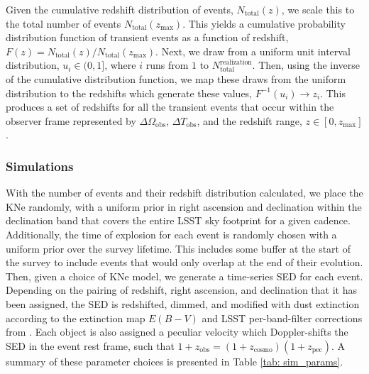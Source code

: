 Given the cumulative redshift distribution of events, $N_{\mathrm{total}}(z)$, we scale this to the total number of events $N_{\mathrm{total}}(z_{\mathrm{max}})$. This yields a cumulative probability distribution function of transient events as a function of redshift, $F(z) = N_{\mathrm{total}}(z)/ N_{\mathrm{total}}(z_{\mathrm{max}})$. Next, we draw from a uniform unit interval distribution, $u_i\in(0,1]$, where $i$ runs from $1$ to $N_{\mathrm{ total}}^{\mathrm{realization}}$. Then, using the inverse of the cumulative distribution function, we map these draws from the uniform distribution to the redshifts which generate these values, $F^{-1}(u_i) \rightarrow z_i$. This produces a set of redshifts for all the transient events that occur within the observer frame represented by $\Delta \Omega_{\mathrm{obs}}$, $\Delta T_{\mathrm{obs}}$, and the redshift range, $z \in [0,z_{\mathrm{max}}]$.

\subsubsection{Simulations}
With the number of events and their redshift distribution calculated, we place the KNe randomly, with a uniform prior in right ascension and declination within the declination band that covers the entire LSST sky footprint for a given cadence. Additionally, the time of explosion for each event is randomly chosen with a uniform prior over the survey lifetime. This includes some buffer at the start of the survey to include events that would only overlap at the end of their evolution. Then, given a choice of KNe model, we generate a time-series SED for each event. Depending on the pairing of redshift, right ascension, and declination that it has been assigned, the SED is redshifted, dimmed, and modified with dust extinction according to the extinction map $E(B-V)$ and LSST per-band-filter corrections from
\citet{Schlafly2011}. Each object is also assigned a peculiar velocity which Doppler-shifts the SED in the event rest frame, such that $1 + z_{\mathrm{obs}} = (1+z_{\mathrm{cosmo}})(1+z_{\mathrm{pec}})$. A summary of these parameter choices is presented in Table \ref{tab: sim_params}.

\begin{table}[h!]
\centering
{}
 \caption{Parameters used to generate the simulated LSST kilonovae observations.}\label{tab: sim_params}
\end{table}

